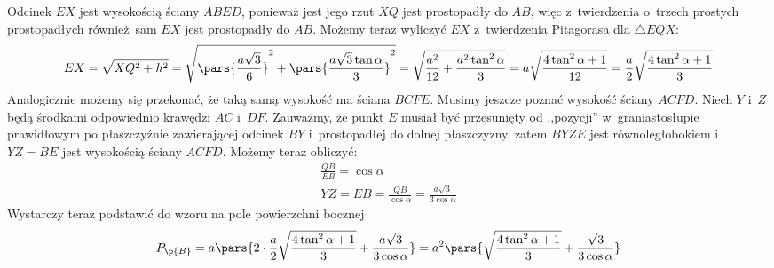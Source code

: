 Odcinek \(EX\) jest wysokością ściany \(ABED\), ponieważ jest jego rzut \(XQ\) jest prostopadły do \(AB\), więc z~twierdzenia o~trzech prostych prostopadłych również sam \(EX\) jest prostopadły do \(AB\). Możemy teraz wyliczyć \(EX\) z~twierdzenia Pitagorasa dla \(\triangle{EQX}\):
\begin{equation*}
    EX = \sqrt{XQ^2 + h^2}
    = \sqrt{\pars{\frac{a\sqrt{3}}{6}}^2 + \pars{\frac{a\sqrt{3}\tan\alpha}{3}}^2}
    = \sqrt{\frac{a^2}{12} + \frac{a^2\tan^2\alpha}{3}}
    = a\sqrt{\frac{4\tan^2\alpha + 1}{12}}
    = \frac{a}{2}\sqrt{\frac{4\tan^2\alpha + 1}{3}}
\end{equation*}
Analogicznie możemy się przekonać, że taką samą wysokość ma ściana \(BCFE\). Musimy jeszcze poznać wysokość ściany \(ACFD\). Niech \(Y\) i~\(Z\) będą środkami odpowiednio krawędzi \(AC\) i~\(DF\). Zauważmy, że punkt \(E\) musiał być przesunięty od ,,pozycji'' w~graniastosłupie prawidłowym po płaszczyźnie zawierającej odcinek \(BY\) i~prostopadłej do dolnej płaszczyzny, zatem \(BYZE\) jest równoległobokiem i~\(YZ = BE\) jest wysokością ściany \(ACFD\). Możemy teraz obliczyć:
\begin{gather*}
    \frac{QB}{EB} = \cos\alpha\\
    YZ = EB = \frac{QB}{\cos\alpha} = \frac{a\sqrt{3}}{3\cos\alpha}
\end{gather*}
Wystarczy teraz podstawić do wzoru na pole powierzchni bocznej
\begin{equation*}
    P_\p{B}
    = a\pars{2 \cdot \frac{a}{2}\sqrt{\frac{4\tan^2\alpha + 1}{3}} + \frac{a\sqrt{3}}{3\cos\alpha}}
    = a^2\pars{\sqrt{\frac{4\tan^2\alpha + 1}{3}} + \frac{\sqrt{3}}{3\cos\alpha}}
\end{equation*}
